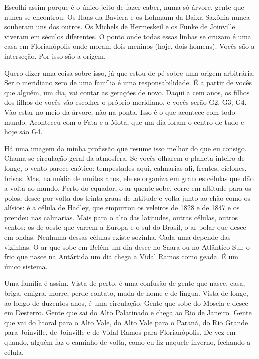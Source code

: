 \documentclass[
  brazilian,
  11pt,
  openany]{book}
\begin{document}
Escolhi assim porque é o único jeito de fazer caber, numa só árvore,
gente que nunca se encontrou. Os Haas da Baviera e os Lohmann da Baixa
Saxônia nunca souberam uns dos outros. Os Michels de Hermeskeil e os
Funke de Joinville viveram em séculos diferentes. O ponto onde todas
essas linhas se cruzam é uma casa em Florianópolis onde moram dois
meninos (hoje, dois homens). Vocês são a interseção. Por isso são a
origem.

Quero dizer uma coisa sobre isso, já que estou de pé sobre uma origem
arbitrária. Ser o meridiano zero de uma família é uma responsabilidade.
É a partir de vocês que alguém, um dia, vai contar as gerações de novo.
Daqui a cem anos, os filhos dos filhos de vocês vão escolher o próprio
meridiano, e vocês serão G2, G3, G4. Vão estar no meio da árvore, não na
ponta. Isso é o que acontece com todo mundo. Aconteceu com o Fata e a
Mota, que um dia foram o centro de tudo e hoje são G4.

Há uma imagem da minha profissão que resume isso melhor do que eu
consigo. Chama-se circulação geral da atmosfera. Se vocês olharem o
planeta inteiro de longe, o vento parece caótico: tempestades aqui,
calmarias ali, frentes, ciclones, brisas. Mas, na média de muitos anos,
ele se organiza em grandes células que dão a volta ao mundo. Perto do
equador, o ar quente sobe, corre em altitude para os polos, desce por
volta dos trinta graus de latitude e volta junto ao chão como os
alísios: é a célula de Hadley, que empurrou os veleiros de 1828 e de
1847 e os prendeu nas calmarias. Mais para o alto das latitudes, outras
células, outros ventos: os de oeste que varrem a Europa e o sul do
Brasil, o ar polar que desce em ondas. Nenhuma dessas células existe
sozinha. Cada uma depende das vizinhas. O ar que sobe em Belém um dia
desce no Saara ou no Atlântico Sul; o frio que nasce na Antártida um dia
chega a Vidal Ramos como geada. É um único sistema.

Uma família é assim. Vista de perto, é uma confusão de gente que nasce,
casa, briga, emigra, morre, perde contato, muda de nome e de língua.
Vista de longe, ao longo de duzentos anos, é uma circulação. Gente que
sobe do Mosela e desce em Desterro. Gente que sai do Alto Palatinado e
chega ao Rio de Janeiro. Gente que vai do litoral para o Alto Vale, do
Alto Vale para o Paraná, do Rio Grande para Joinville, de Joinville e de
Vidal Ramos para Florianópolis. De vez em quando, alguém faz o caminho
de volta, como eu fiz naquele inverno, fechando a célula.
\end{document}
